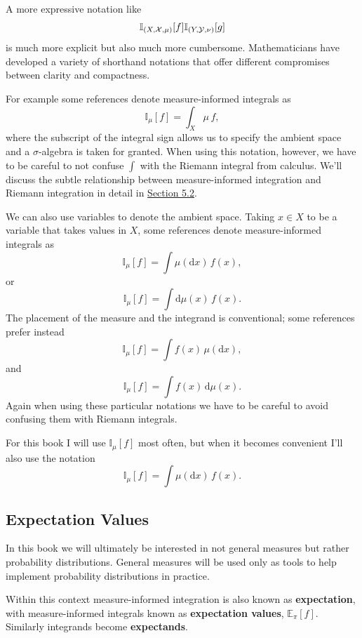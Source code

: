 \documentclass[
  letterpaper,
  DIV=11,
  numbers=noendperiod]{scrartcl}
\begin{document}
A more expressive notation like \[
\mathbb{I}_{(X, \mathcal{X}, \mu)}[f]
\\
\mathbb{I}_{(Y, \mathcal{Y}, \nu)}[g]
\] is much more explicit but also much more cumbersome. Mathematicians
have developed a variety of shorthand notations that offer different
compromises between clarity and compactness.

For example some references denote measure-informed integrals as \[
\mathbb{I}_{\mu}[f] = \int_{X} \mu \, f,
\] where the subscript of the integral sign allows us to specify the
ambient space and a \(\sigma\)-algebra is taken for granted. When using
this notation, however, we have to be careful to not confuse \(\int\)
with the Riemann integral from calculus. We'll discuss the subtle
relationship between measure-informed integration and Riemann
integration in detail in \href{@sec:integration_on_R}{Section 5.2}.

We can also use variables to denote the ambient space. Taking
\(x \in X\) to be a variable that takes values in \(X\), some references
denote measure-informed integrals as \[
\mathbb{I}_{\mu}[f] = \int \mu(\mathrm{d} x) \, f(x),
\] or \[
\mathbb{I}_{\mu}[f] = \int \mathrm{d} \mu(x) \, f(x).
\] The placement of the measure and the integrand is conventional; some
references prefer instead \[
\mathbb{I}_{\mu}[f] = \int f(x) \, \mu(\mathrm{d} x),
\] and \[
\mathbb{I}_{\mu}[f] = \int f(x) \, \mathrm{d} \mu(x).
\] Again when using these particular notations we have to be careful to
avoid confusing them with Riemann integrals.

For this book I will use \(\mathbb{I}_{\mu}[f]\) most often, but when it
becomes convenient I'll also use the notation \[
\mathbb{I}_{\mu}[f] = \int \mu(\mathrm{d} x) \, f(x).
\]

\hypertarget{expectation-values}{%
\subsection{Expectation Values}\label{expectation-values}}

In this book we will ultimately be interested in not general measures
but rather probability distributions. General measures will be used only
as tools to help implement probability distributions in practice.

Within this context measure-informed integration is also known as
\textbf{expectation}, with measure-informed integrals known as
\textbf{expectation values}, \(\mathbb{E}_{\pi}[f]\). Similarly
integrands become \textbf{expectands}.
\end{document}
